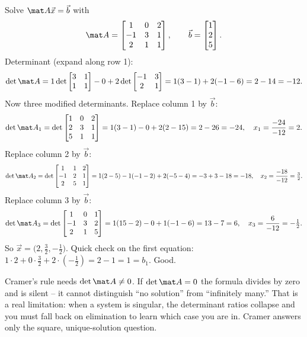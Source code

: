 Solve $\mat A\vec x=\vec b$ with
\[
\mat A=\begin{bmatrix} 1 & 0 & 2 \\ -1 & 3 & 1 \\ 2 & 1 & 1 \end{bmatrix},\qquad
\vec b=\begin{bmatrix} 1 \\ 2 \\ 5\end{bmatrix}.
\]
Determinant (expand along row 1):
\[
\det\mat A=1\det\begin{bmatrix}3&1\\1&1\end{bmatrix}-0+2\det\begin{bmatrix}-1&3\\2&1\end{bmatrix}
=1(3-1)+2(-1-6)=2-14=-12.
\]
Now three modified determinants. Replace column 1 by $\vec b$:
\[
\det\mat A_1=\det\begin{bmatrix} 1 & 0 & 2 \\ 2 & 3 & 1 \\ 5 & 1 & 1 \end{bmatrix}
=1(3-1)-0+2(2-15)=2-26=-24,\quad x_1=\frac{-24}{-12}=2.
\]
Replace column 2 by $\vec b$:
\[
\det\mat A_2=\det\begin{bmatrix} 1 & 1 & 2 \\ -1 & 2 & 1 \\ 2 & 5 & 1 \end{bmatrix}
=1(2-5)-1(-1-2)+2(-5-4)=-3+3-18=-18,\quad x_2=\frac{-18}{-12}=\tfrac32.
\]
Replace column 3 by $\vec b$:
\[
\det\mat A_3=\det\begin{bmatrix} 1 & 0 & 1 \\ -1 & 3 & 2 \\ 2 & 1 & 5 \end{bmatrix}
=1(15-2)-0+1(-1-6)=13-7=6,\quad x_3=\frac{6}{-12}=-\tfrac12.
\]
So $\vec x=\big(2,\tfrac32,-\tfrac12\big)$. Quick check on the first equation:
$1\cdot2+0\cdot\tfrac32+2\cdot(-\tfrac12)=2-1=1=b_1$. Good.

\begin{trapbox}
Cramer's rule needs $\det\mat A\neq0$. If $\det\mat A=0$ the formula divides by zero and is silent --
it cannot distinguish ``no solution'' from ``infinitely many.'' That is a real limitation: when a
system is singular, the determinant ratios collapse and you must fall back on elimination to learn
which case you are in. Cramer answers only the square, unique-solution question.
\end{trapbox}

